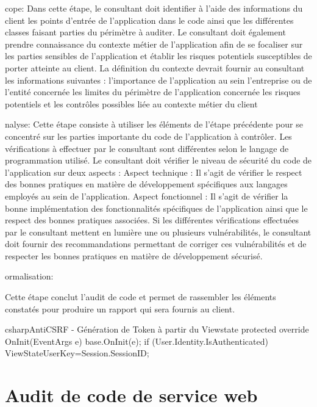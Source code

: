 \documentclass[twoside,a4paper,12pt,titlepage]{book}
\begin{document}
\item[\textbf{S}]cope: 
Dans cette étape, le consultant doit identifier à l’aide des informations du client les points d’entrée de l’application dans le code ainsi que les différentes classes faisant parties du périmètre à auditer. Le consultant doit également prendre connaissance du contexte métier de l’application afin de se focaliser sur les parties sensibles de l’application et établir les risques potentiels susceptibles de porter atteinte au client.
La définition du contexte devrait fournir au consultant les informations suivantes :
 l'importance de l’application au sein l'entreprise ou de l’entité concernée
 les limites du périmètre de l’application concernée
 les risques potentiels et les contrôles possibles liée au contexte métier du client
\item[\textbf{A}]nalyse: 
Cette étape consiste à  utiliser les éléments de l’étape précédente pour se concentré sur les parties importante du code de l’application à contrôler. Les vérifications à effectuer par le consultant sont différentes selon le langage de programmation utilisé. Le consultant doit vérifier le niveau de sécurité du code de l’application sur deux aspects :
Aspect technique :
 Il s’agit de vérifier le respect des bonnes pratiques en matière de développement spécifiques aux langages 						  employés au sein de l’application. 
Aspect fonctionnel :
 Il s’agit de vérifier la bonne implémentation des fonctionnalités spécifiques de l’application ainsi que le respect 					des bonnes pratiques associées.
Si les différentes vérifications effectuées par le consultant mettent en lumière une ou plusieurs vulnérabilités, le consultant doit fournir des recommandations permettant de corriger ces vulnérabilités  et de respecter les bonnes pratiques en matière de développement sécurisé.

\item[\textbf{F}]ormalisation: 

Cette étape conclut l’audit de code et permet de rassembler les éléments constatés pour produire un rapport qui sera fournis au client.
\begin{Config}{csharp}{AntiCSRF - Génération de Token à partir du Viewstate}
protected override OnInit(EventArgs e) {
	base.OnInit(e);
	if (User.Identity.IsAuthenticated)
		ViewStateUserKey=Session.SessionID; }
\end{Config}	

\section{Audit de code de service web}
\end{document}
